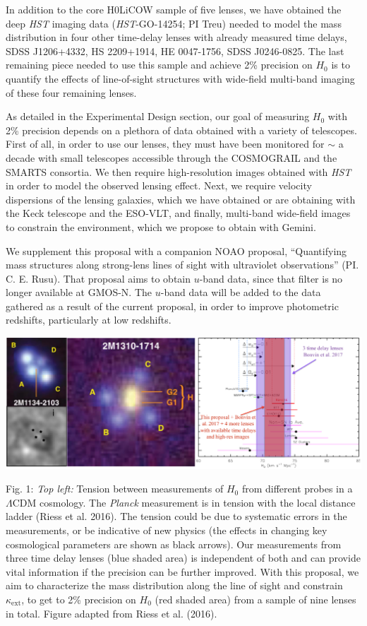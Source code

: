 \documentclass[a4paper,11pt]{article}
\begin{document}
In addition to the core H0LiCOW sample of five lenses, we have obtained the deep {\it HST} imaging data ({\it HST}-GO-14254; PI Treu) needed to model the mass distribution in four other time-delay lenses with already measured time delays, SDSS J1206+4332, HS 2209+1914, HE 0047-1756, SDSS J0246-0825. The last remaining piece needed to use this sample and achieve 2\% precision on $H_{0}$ is to quantify the effects of line-of-sight structures with wide-field multi-band imaging of these four remaining lenses. 

As detailed in the Experimental Design section, our goal of measuring $H_{0}$ with 2\% precision depends on a plethora of data obtained with a variety of telescopes. First of all, in order to use our lenses, they must have been monitored for $\sim$ a decade with small telescopes accessible through the COSMOGRAIL and the SMARTS consortia. We then require high-resolution images obtained with {\it HST} in order to model the observed lensing effect. Next, we require velocity dispersions of the lensing galaxies, which we have obtained or are obtaining with the Keck telescope and the ESO-VLT, and finally, multi-band wide-field images to constrain the environment, which we propose to obtain with Gemini.

We supplement this proposal with a companion NOAO proposal, ``Quantifying mass structures along strong-lens lines of sight with ultraviolet observations'' (PI. C. E. Rusu). That proposal aims to obtain $u$-band data, since that filter is no longer available at GMOS-N. The $u$-band data will be added to the data gathered as a result of the current proposal, in order to improve photometric redshifts, particularly at low redshifts. 

\begin{minipage}{\textwidth}
\includegraphics[width=0.95\hsize]{figure.eps}
\end{minipage}
Fig. 1: {\it Top left:} Tension between measurements of $H_{0}$ from different probes in a $\Lambda$CDM cosmology. The {\it Planck} measurement is in tension with the local distance ladder (Riess et al. 2016). The tension could be due to systematic errors in the measurements, or be indicative of new physics (the effects in changing key cosmological parameters are shown as black arrows). Our measurements from three time delay lenses (blue shaded area) is independent of both and can provide vital information if the precision can be further improved. With this proposal, we aim to characterize the mass distribution along the line of sight and constrain $\kappa_\mathrm{ext}$, to get to 2\% precision on $H_{0}$ (red shaded area) from a sample of nine lenses in total. Figure adapted from Riess et al. (2016).
  
\end{document}
